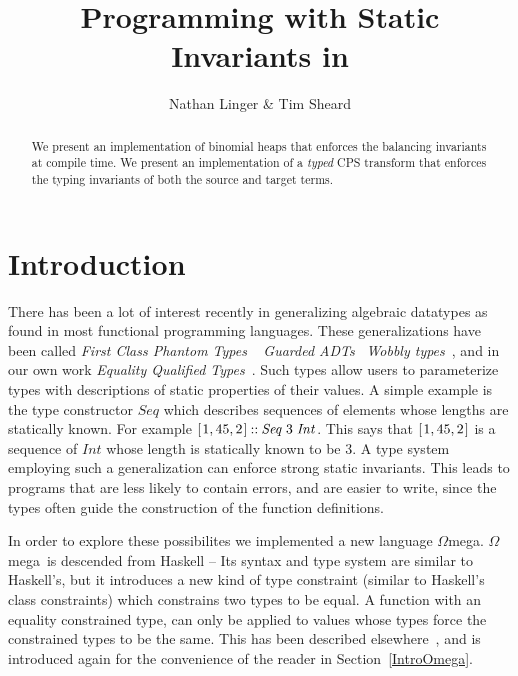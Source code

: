 \documentclass[10pt]{article}
\title{Programming with Static Invariants in \Wmega{}}
\author{Nathan Linger \& Tim Sheard}
\newcommand{\Conid}[1]{\mathit{#1}}
\newcommand{\Wmega}{\ensuremath{\Omega}mega}
\begin{document}
\maketitle 

\begin{abstract}
We present an implementation of binomial heaps that 
enforces the balancing invariants at compile time.
We present an implementation of a \emph{typed} CPS transform 
that enforces the typing invariants of both the source and target terms.
\end{abstract}

\section{Introduction}

There has been a lot of interest recently in generalizing algebraic
datatypes as found in most functional programming languages. These
generalizations have been called {\it First Class Phantom Types}
~\cite{FirstClassPhantomTypes} {\it Guarded ADTs}~\cite{xi-gadt,
simonet-pottier-hmg} {\it Wobbly types}~\cite{peytonjones-wobbly},
and in our own work {\it Equality Qualified Types}~\cite{GPCE,ONWARD,sheardLFM04}.
Such types allow users to parameterize types with descriptions of 
static properties of their values.
A simple example is the type constructor \ensuremath{\Conid{Seq}} which
describes sequences of elements whose lengths are statically known. For
example \ensuremath{[\mskip1.5mu \mathrm{1},\mathrm{45},\mathrm{2}\mskip1.5mu]\mathbin{::}\Conid{Seq}\;\mathrm{3}\;\Conid{Int}}. This says that \ensuremath{[\mskip1.5mu \mathrm{1},\mathrm{45},\mathrm{2}\mskip1.5mu]} is a
sequence of \ensuremath{\Conid{Int}} whose length is statically known to be \ensuremath{\mathrm{3}}.
A type system employing such a generalization can enforce strong
static invariants.
This leads to programs that are less likely to contain errors, and are
easier to write, since the types often guide the construction of the
function definitions. 

In order to explore these possibilites we implemented
a new language \Wmega. \Wmega\  is descended from Haskell -- 
Its syntax and type system
are similar to Haskell's, but it introduces a new kind of type
constraint (similar to Haskell's class constraints) which constrains
two types to be equal. A function with an equality constrained type, can
only be applied to values whose types force the constrained types to be
the same. This has been described elsewhere~\cite{GPCE,ONWARD,sheardLFM04}, and is
introduced again for the convenience of the reader in 
Section~\ref{IntroOmega}.
\end{document}
